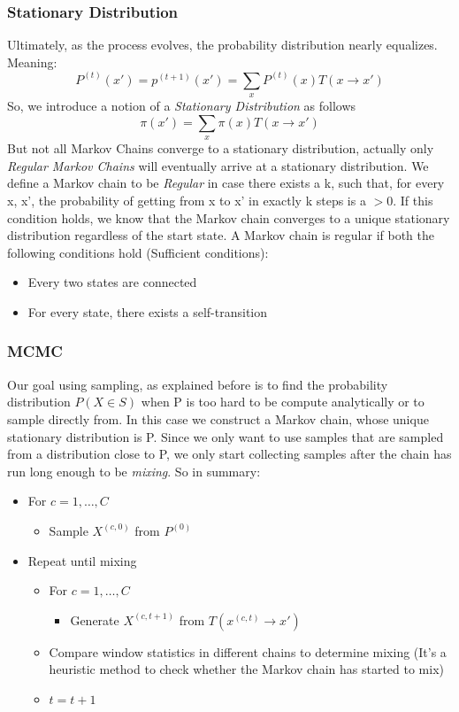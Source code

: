 \documentclass{article}
\begin{document}
\subsubsection{Stationary Distribution}
    Ultimately, as the process evolves, the probability distribution nearly equalizes. Meaning: $$ P^(t) (x') = p^(t+1)(x') = \sum_x P^{(t)}(x)T(x \rightarrow x')$$
    So, we introduce a notion of a \textit{Stationary Distribution} as follows $$ \pi(x') = \sum_x \pi(x)T(x \rightarrow x')$$
    But not all Markov Chains converge to a stationary distribution, actually only \textit{Regular Markov Chains} will eventually arrive at a stationary distribution. We define a Markov chain to be \textit{Regular} in case there exists a k, such that, for every x, x', the probability of getting from x to x' in exactly k steps is a $ > 0$. If this condition holds, we know that the Markov chain converges to a unique stationary distribution regardless of the start state. A Markov chain is regular if both the following conditions hold (Sufficient conditions):

    \begin{itemize}
        \item Every two states are connected
        \item For every state, there exists a self-transition
    \end{itemize}

\subsubsection{MCMC}
    Our goal using sampling, as explained before is to find the probability distribution $P(X \in S)$ when P is too hard to be compute analytically or to sample directly from. In this case we construct a Markov chain, whose unique stationary distribution is P. Since we only want to use samples that are sampled from a distribution close to P, we only start collecting samples after the chain has run long enough to be \textit{mixing}. So in summary:

    \begin{itemize}
        \item For $c=1, \ldots, C$
        \begin{itemize}
            \item Sample $X^{(c, 0)}$ from $P^{(0)}$
        \end{itemize}
        \item Repeat until mixing
        \begin{itemize}
            \item For $c=1, \ldots, C$
            \begin{itemize}
                \item Generate $X^{(c, t+1)}$ from $T(x^{(c, t)} \rightarrow x')$
            \end{itemize}
            \item Compare window statistics in different chains to determine mixing (It's a heuristic method to check whether the Markov chain has started to mix)
            \item $t=t+1$
        \end{itemize}
    \end{itemize}
\end{document}
